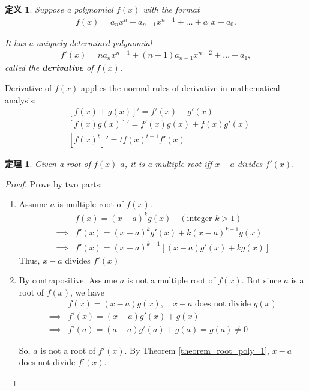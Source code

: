 \documentclass[utf8]{ctexbook}
\newtheorem{theorem}{定理}[section]
\newtheorem{definition}{定义}[section]
\begin{document}
\begin{definition}
\label{def_root_poly_derivative}
Suppose a polynomial $f(x)$ with the format
\begin{align*}
f(x) = a_n x^n + a_{n-1} x^{n-1} + \ldots + a_1 x + a_0 .
\end{align*}

It has a uniquely determined polynomial
\begin{align*}
f' (x) = n a_n x^{n-1} + (n-1) a_{n-1} x^{n-2} + \ldots + a_1 ,
\end{align*}
called the \textbf{derivative} of $f(x)$.

\end{definition}

Derivative of $f(x)$ applies the normal rules of derivative in mathematical analysis:
\begin{align*}
& [f(x) + g(x)]' = f' (x) + g' (x) \\
& [f(x) g(x)]' = f'(x) g(x) + f(x) g' (x) \\
& [f(x)^t]' = t f(x)^{t-1} f'(x)
\end{align*}

\begin{theorem}
\label{theorem_root_poly_3}
Given a root of $f(x)$ $a$, it is a multiple root iff $x-a$ divides $f'(x)$.
\end{theorem}

\begin{proof}
Prove by two parts:
\begin{enumerate}
\item{Assume $a$ is multiple root of $f(x)$.
\begin{align*}
& f(x) = (x-a)^k g(x) \quad (\mbox{integer }k > 1) \\
\implies & f' (x) = (x-a)^k g' (x) + k (x-a)^{k-1} g(x) \\
\implies & f'(x) = (x-a)^{k-1} [ (x-a) g'(x) + k g(x) ]
\end{align*}
Thus, $x-a$ divides $f'(x)$
}
\item{By contrapositive. Assume $a$ is not a multiple root of $f(x)$. But since $a$ is a root of $f(x)$, we have
\begin{align*}
& f(x) = (x-a) g(x), \quad x-a \mbox{ does not divide } g(x) \\
\implies & f'(x) = (x-a) g'(x) + g(x) \\
\implies & f'(a) = (a-a)g'(a) + g(a) = g(a) \neq 0 
\end{align*}

So, $a$ is not a root of $f'(x)$. By Theorem \ref{theorem_root_poly_1}, $x-a$ does not divide $f'(x)$. 

}
\end{enumerate}
\end{proof}
\end{document}
